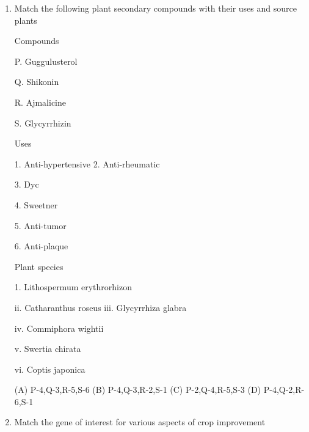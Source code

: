 \documentclass[journal]{IEEEtran}
\begin{document}
\begin{enumerate}
{S. Acceleration of DNA-coated microprojectiles is carried out with compressed CO

(A) P. S

(B) R. S

(C) P, R

(D) Q. S

}
\item {Match the following plant secondary compounds with their uses and source plants}
\begin{minipage}{0.3\textwidth}
	\begin{flushleft}

Compounds

P. Guggulusterol

Q. Shikonin

R. Ajmalicine

S. Glycyrrhizin


		\end{flushleft}
		\end{minipage}
		\begin{minipage}{0.3\textwidth}
		\begin{center}

Uses

1. Anti-hypertensive
2. Anti-rheumatic

3. Dyc

4. Sweetner

5. Anti-tumor

6. Anti-plaque
		\end{center}
		\end{minipage}
		\begin{minipage}{0.5\textwidth}
		\begin{flushright}
Plant species


1. Lithospermum erythrorhizon

ii. Catharanthus roseus
iii. Glycyrrhiza glabra

iv. Commiphora wightii

v. Swertia chirata

vi. Coptis japonica

		\end{flushright}
		\end{minipage}
(A) P-4,Q-3,R-5,S-6
(B) P-4,Q-3,R-2,S-1
(C) P-2,Q-4,R-5,S-3
(D) P-4,Q-2,R-6,S-1

\item{Match the gene of interest for various aspects of crop improvement}
	\begin{minipage}{0.5\textwidth}
	\begin{flushleft}


\end{flushleft}
\end{minipage}
\end{enumerate}
\end{document}
